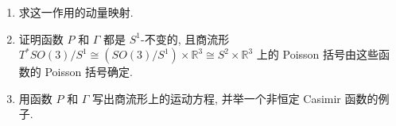 \begin{RiemannExercise}
\begin{enumerate}[label=(\arabic*),ref=\arabic*,leftmargin=*]
\begin{enumerate}[label=(\alph*),leftmargin=*]
\[\begin{pmatrix}
    0 & 0 & 1
  \end{pmatrix}
\]
(对应于绕 $z$ 轴的旋转). 证明对于这一作用到 $T^*SO(3)$ 的提升, $H$ 是 $S^1$-不变的.
\item 求这一作用的动量映射.
\item 证明函数 $P$ 和 $\Gamma$ 都是 $S^1$-不变的, 且商流形 $T^*SO(3)/S^1\cong(SO(3)/S^1)\times\mathbb{R}^3\cong S^2\times\mathbb{R}^3$ 上的 Poisson 括号由这些函数的 Poisson 括号确定.
\item 用函数 $P$ 和 $\Gamma$ 写出商流形上的运动方程, 并举一个非恒定 Casimir 函数的例子.
\end{enumerate}
\end{enumerate}
\end{RiemannExercise}
